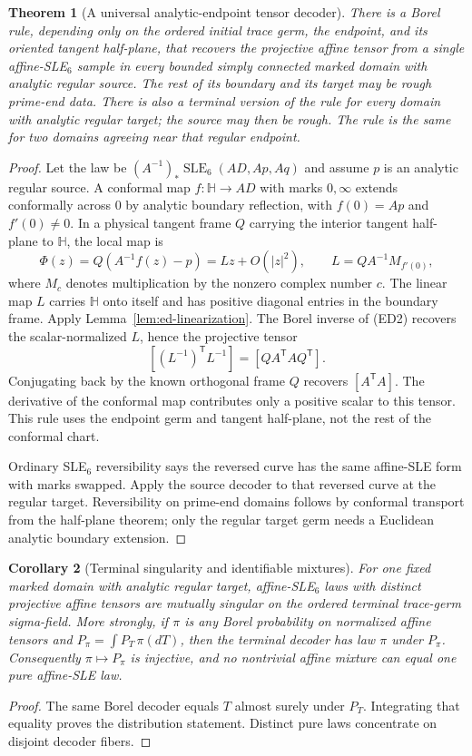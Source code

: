 \documentclass[11pt]{article}
\newtheorem{theorem}{Theorem}[section]
\newtheorem{corollary}[theorem]{Corollary}
\theoremstyle{definition}\newtheorem{definition}[theorem]{Definition}
\theoremstyle{remark}\newtheorem{remark}[theorem]{Remark}
\begin{document}
\begin{theorem}[A universal analytic-endpoint tensor decoder]
\label{thm:ed-analytic}
There is a Borel rule, depending only on the ordered initial trace germ,
the endpoint, and its oriented tangent half-plane, that recovers the
projective affine tensor from a single affine-SLE$_6$ sample in every
bounded simply connected marked domain with analytic regular source.
The rest of its boundary and its target may be rough prime-end data.
There is also a terminal version of the rule for every domain with
analytic regular target; the source may then be rough. The rule is the
same for two domains agreeing near that regular endpoint.
\end{theorem}
\begin{proof}
Let the law be
$(A^{-1})_*\operatorname{SLE}_6(AD,Ap,Aq)$ and assume $p$ is an analytic
regular source. A conformal map $f:\mathbb H\to AD$ with marks
$0,\infty$ extends conformally across $0$ by analytic boundary
reflection, with $f(0)=Ap$ and $f'(0)\ne0$. In a physical tangent frame
$Q$ carrying the interior tangent half-plane to $\mathbb H$, the local
map is
\[
 \Phi(z)=Q(A^{-1}f(z)-p)=Lz+O(|z|^2),
 \qquad L=QA^{-1}M_{f'(0)},
 \tag{ED11}
\]
where $M_c$ denotes multiplication by the nonzero complex number $c$.
The linear map $L$ carries $\mathbb H$ onto itself and has positive
diagonal entries in the boundary frame. Apply
Lemma~\ref{lem:ed-linearization}. The Borel inverse of (ED2) recovers
the scalar-normalized $L$, hence the projective tensor
\[
 [(L^{-1})^{\mathsf T}L^{-1}]
       =[QA^{\mathsf T}AQ^{\mathsf T}].
 \tag{ED12}
\]
Conjugating back by the known orthogonal frame $Q$ recovers
$[A^{\mathsf T}A]$. The derivative of the conformal map contributes
only a positive scalar to this tensor. This rule uses the endpoint
germ and tangent half-plane, not the rest of the conformal chart.

Ordinary SLE$_6$ reversibility \cite{ms} says the reversed curve has the same affine-SLE form
with marks swapped. Apply the source decoder to that reversed curve at
the regular target. Reversibility on prime-end domains follows by
conformal transport from the half-plane theorem; only the regular
target germ needs a Euclidean analytic boundary extension.
\end{proof}

\begin{corollary}[Terminal singularity and identifiable mixtures]
\label{cor:ed-mixtures}
For one fixed marked domain with analytic regular target, affine-SLE$_6$
laws with distinct projective affine tensors are mutually singular on
the ordered terminal trace-germ sigma-field. More strongly, if
$\pi$ is any Borel probability on normalized affine tensors and
$P_\pi=\int P_T\,\pi(dT)$, then the terminal decoder has law $\pi$
under $P_\pi$. Consequently $\pi\mapsto P_\pi$ is injective, and no
nontrivial affine mixture can equal one pure affine-SLE law.
\end{corollary}
\begin{proof}
The same Borel decoder equals $T$ almost surely under $P_T$.
Integrating that equality proves the distribution statement. Distinct
pure laws concentrate on disjoint decoder fibers.
\end{proof}
\end{document}
